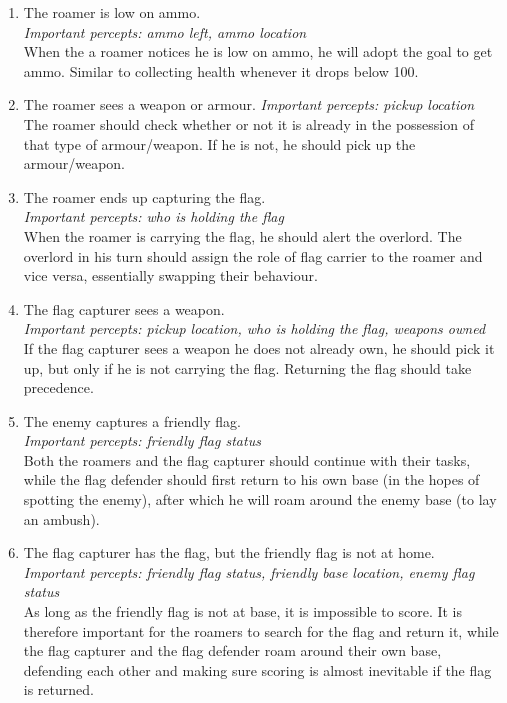 \begin{enumerate}
	\item The roamer is low on ammo. \\
	\textit{Important percepts: ammo left, ammo location} \\
	When the a roamer notices he is low on ammo, he will adopt the goal to get ammo. Similar to collecting health whenever it drops below 100.
	\item The roamer sees a weapon or armour.
	\textit{Important percepts: pickup location} \\
	The roamer should check whether or not it is already in the possession of that type of armour/weapon. If he is not, he should pick up the armour/weapon.
	\item The roamer ends up capturing the flag. \\
	\textit{Important percepts: who is holding the flag} \\
	When the roamer is carrying the flag, he should alert the overlord. The overlord in his turn should assign the role of flag carrier to the roamer and vice versa, essentially swapping their behaviour.
	\item The flag capturer sees a weapon. \\
	\textit{Important percepts: pickup location, who is holding the flag, weapons owned} \\
	If the flag capturer sees a weapon he does not already own, he should pick it up, but only if he is not carrying the flag. Returning the flag should take precedence.
	\item The enemy captures a friendly flag. \\
	\textit{Important percepts: friendly flag status} \\
	Both the roamers and the flag capturer should continue with their tasks, while the flag defender should first return to his own base (in the hopes of spotting the enemy), after which he will roam around the enemy base (to lay an ambush).
	\item The flag capturer has the flag, but the friendly flag is not at home. \\
	\textit{Important percepts: friendly flag status, friendly base location, enemy flag status} \\
	As long as the friendly flag is not at base, it is impossible to score. It is therefore important for the roamers to search for the flag and return it, while the flag capturer and the flag defender roam around their own base, defending each other and making sure scoring is almost inevitable if the flag is returned.
\end{enumerate}